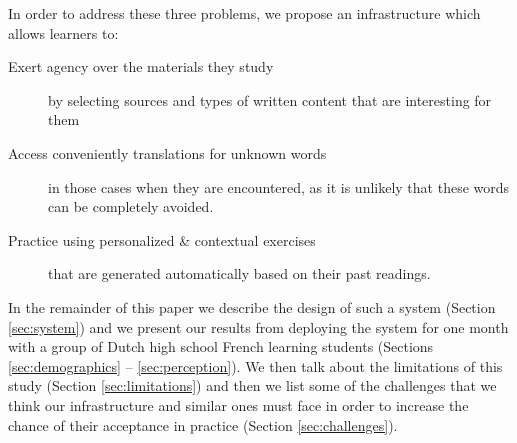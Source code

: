 In order to address these three problems, we propose an infrastructure which allows learners to: 

	\begin{description}
	
		\item [Exert agency over the materials they study] by selecting sources and types of written content that are interesting for them
	
		\item [Access conveniently translations for unknown words] in those cases when they are encountered, as it is unlikely that these words can be completely avoided.

		\item [Practice using personalized \& contextual exercises] that are generated automatically based on their past readings.

	\end{description}


In the remainder of this paper we describe the design of such a system (Section \ref{sec:system}) and we present our results from deploying the system for one month with a group of \students Dutch high school French learning students (Sections \ref{sec:demographics} -- \ref{sec:perception}). We then talk about the limitations of this study (Section \ref{sec:limitations}) and then we list some of the challenges that we think our infrastructure and similar ones must face in order to increase the chance of their acceptance in practice (Section \ref{sec:challenges}).

